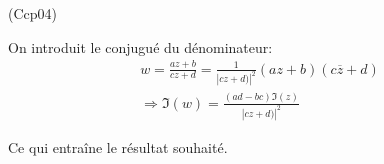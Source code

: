 \begin{tiny}(Ccp04)\end{tiny} \label{Ccp04} On introduit le conjugué du dénominateur:
\begin{multline*}
  w = \frac{az+b}{cz+d} = \frac{1}{\left|cz+d)\right|^2}(az+b)(c\overline{z}+d)\\
  \Rightarrow \Im(w) = \frac{(ad-bc)\Im(z)}{\left|cz+d)\right|^2}
\end{multline*}

Ce qui entraîne le résultat souhaité.

